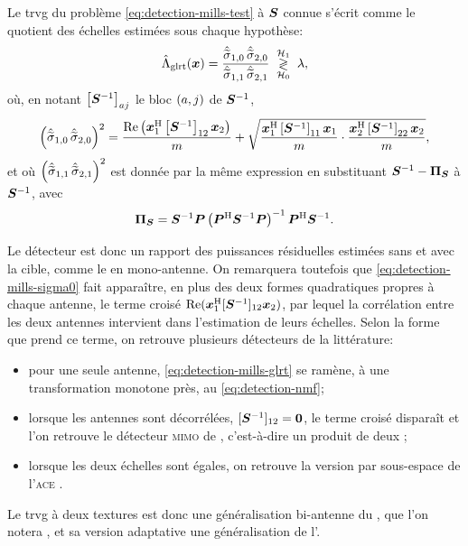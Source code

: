 \begin{proposition}
\label{prop:detection-mills-glrt}
  Le trvg du problème \cref{eq:detection-mills-test} à $\boldsymbol{S}$ connue s'écrit comme le quotient des échelles estimées sous chaque hypothèse:
  \begin{equation}
    \hat{\Lambda}_{\mathrm{glrt}}(\boldsymbol{x})
    =
    \frac{\hat{\widetilde{\sigma}}_{1,0}\,\hat{\widetilde{\sigma}}_{2,0}}{\hat{\widetilde{\sigma}}_{1,1}\,\hat{\widetilde{\sigma}}_{2,1}}
    \;\underset{\mathcal{H}_0}{\overset{\mathcal{H}_1}{\gtrless}}\; \lambda,
    \label{eq:detection-mills-glrt}
  \end{equation}
  où, en notant $\left[{\boldsymbol{S}}^{-1}\right]_{aj}$ le bloc $(a,j)$ de ${\boldsymbol{S}}^{-1}$,
  \begin{equation}
    \left(\hat{\widetilde{\sigma}}_{1,0}\,\hat{\widetilde{\sigma}}_{2,0}\right)^2
    =
    \frac{\operatorname{\operatorname{Re}}\left(\boldsymbol{x}_1^{\mathrm{H}}\left[{\boldsymbol{S}}^{-1}\right]_{12}\boldsymbol{x}_2\right)}{m}
    +
    \sqrt{
      \frac{\boldsymbol{x}_1^{\mathrm{H}}\left[{\boldsymbol{S}}^{-1}\right]_{11}\boldsymbol{x}_1}{m}
      \cdot
      \frac{\boldsymbol{x}_2^{\mathrm{H}}\left[{\boldsymbol{S}}^{-1}\right]_{22}\boldsymbol{x}_2}{m}
    },
    \label{eq:detection-mills-sigma0}
  \end{equation}
  et où $\left(\hat{\widetilde{\sigma}}_{1,1}\,\hat{\widetilde{\sigma}}_{2,1}\right)^2$ est donnée par la même expression en substituant ${\boldsymbol{S}}^{-1}-\boldsymbol{\Pi}_{\boldsymbol{S}}$ à ${\boldsymbol{S}}^{-1}$, avec
  \begin{equation}
    \boldsymbol{\Pi}_{\boldsymbol{S}}
    =
    {\boldsymbol{S}}^{-1}\boldsymbol{P}\left(\boldsymbol{P}^{\mathrm{H}}{\boldsymbol{S}}^{-1}\boldsymbol{P}\right)^{-1}\boldsymbol{P}^{\mathrm{H}}{\boldsymbol{S}}^{-1}.
    \label{eq:detection-mills-projecteur}
  \end{equation}
\end{proposition}

Le détecteur est donc un rapport des puissances résiduelles estimées sans et avec la cible, comme le  en mono-antenne. On remarquera toutefois que \cref{eq:detection-mills-sigma0} fait apparaître, en plus des deux formes quadratiques propres à chaque antenne, le terme croisé $\operatorname{\operatorname{Re}}(\boldsymbol{x}_1^{\mathrm{H}}[{\boldsymbol{S}}^{-1}]_{12}\boldsymbol{x}_2)$, par lequel la corrélation entre les deux antennes intervient dans l'estimation de leurs échelles. Selon la forme que prend ce terme, on retrouve plusieurs détecteurs de la littérature:
\begin{itemize}
  \item pour une seule antenne, \cref{eq:detection-mills-glrt} se ramène, à une transformation monotone près, au  \cref{eq:detection-nmf};
  \item lorsque les antennes sont décorrélées, $[{\boldsymbol{S}}^{-1}]_{12}=\boldsymbol{0}$, le terme croisé disparaît et l'on retrouve le détecteur \textsc{mimo} de \citet{Chong201003}, c'est-à-dire un produit de deux ;
  \item lorsque les deux échelles sont égales, on retrouve la version par sous-espace de l'\textsc{ace} \cite{Raghavan2016}.
\end{itemize}
Le trvg à deux textures est donc une généralisation bi-antenne du , que l'on notera , et sa version adaptative une généralisation de l'.

